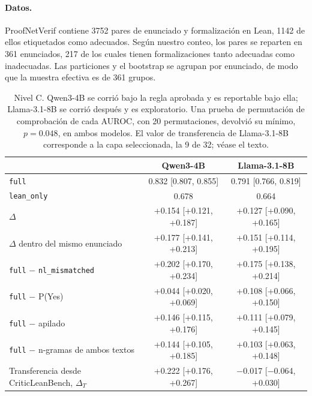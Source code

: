 \documentclass[10pt]{article}
\newcommand{\vr}[1]{\texttt{#1}}
\newcommand{\D}{\Delta}
\begin{document}
\paragraph{Datos.}
ProofNetVerif \citep{proofnetverif} contiene 3752 pares de enunciado y formalización en Lean, 1142 de ellos etiquetados
como adecuados. Según nuestro conteo, los pares se reparten en 361 enunciados, 217 de los cuales tienen formalizaciones tanto adecuadas como inadecuadas.
Las particiones y el bootstrap se agrupan por enunciado, de modo que la muestra efectiva es de 361 grupos.

\begin{table}[h]
\centering
\caption{Nivel C. Qwen3-4B se corrió bajo la regla aprobada y es reportable bajo ella; Llama-3.1-8B se corrió
después y es exploratorio. Una prueba de permutación de comprobación de cada AUROC, con 20 permutaciones, devolvió su mínimo, $p = 0.048$, en
ambos modelos. El valor de transferencia de Llama-3.1-8B corresponde a la capa seleccionada, la 9 de 32; véase el texto.}
\label{tab:c}
\vspace{2pt}
\begin{tabular}{@{}lcc@{}}
\toprule
 & Qwen3-4B & Llama-3.1-8B\\
\midrule
\vr{full}                               & 0.832 [0.807, 0.855] & 0.791 [0.766, 0.819]\\
\vr{lean\_only}                         & 0.678 & 0.664\\
$\D$                                    & +0.154 [+0.121, +0.187] & +0.127 [+0.090, +0.165]\\
$\D$ dentro del mismo enunciado         & +0.177 [+0.141, +0.213] & +0.151 [+0.114, +0.195]\\
\vr{full} $-$ \vr{nl\_mismatched}       & +0.202 [+0.170, +0.234] & +0.175 [+0.138, +0.214]\\
\vr{full} $-$ P(Yes)                    & +0.044 [+0.020, +0.069] & +0.108 [+0.066, +0.150]\\
\vr{full} $-$ apilado                 & +0.146 [+0.115, +0.176] & +0.111 [+0.079, +0.145]\\
\vr{full} $-$ n-gramas de ambos textos       & +0.144 [+0.105, +0.185] & +0.103 [+0.063, +0.148]\\
\midrule
Transferencia desde CriticLeanBench, $\D_T$ & +0.222 [+0.176, +0.267] & −0.017 [−0.064, +0.030]\\
\bottomrule
\end{tabular}
\end{table}
\end{document}
